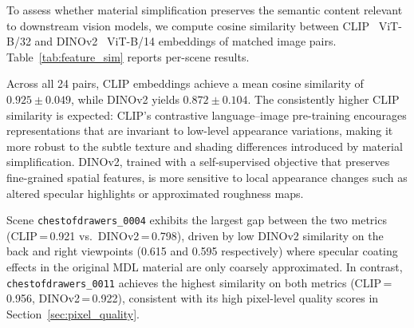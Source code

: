 To assess whether material simplification preserves the semantic content
relevant to downstream vision models, we compute cosine similarity between
CLIP~\cite{Radford2021Learning} ViT-B/32 and DINOv2~\cite{Oquab2023DINOv2}
ViT-B/14 embeddings of matched image pairs.
Table~\ref{tab:feature_sim} reports per-scene results.

\begin{table}[t]
\centering
\caption{Feature-level cosine similarity between MDL and UsdPreviewSurface
renderings (mean $\pm$ std over 6 viewpoints per scene). Higher is better.}
\label{tab:feature_sim}
\end{table}

Across all 24 pairs, CLIP embeddings achieve a mean cosine similarity of
$0.925 \pm 0.049$, while DINOv2 yields $0.872 \pm 0.104$. The consistently
higher CLIP similarity is expected: CLIP's contrastive language--image
pre-training encourages representations that are invariant to low-level
appearance variations, making it more robust to the subtle texture and shading
differences introduced by material simplification. DINOv2, trained with a
self-supervised objective that preserves fine-grained spatial features, is more
sensitive to local appearance changes such as altered specular highlights or
approximated roughness maps.

Scene \texttt{chestofdrawers\_0004} exhibits the largest gap between the two
metrics (CLIP\,=\,0.921 vs.\ DINOv2\,=\,0.798), driven by low DINOv2
similarity on the back and right viewpoints (0.615 and 0.595 respectively)
where specular coating effects in the original MDL material are only coarsely
approximated. In contrast, \texttt{chestofdrawers\_0011} achieves the highest
similarity on both metrics (CLIP\,=\,0.956, DINOv2\,=\,0.922), consistent with
its high pixel-level quality scores in Section~\ref{sec:pixel_quality}.

